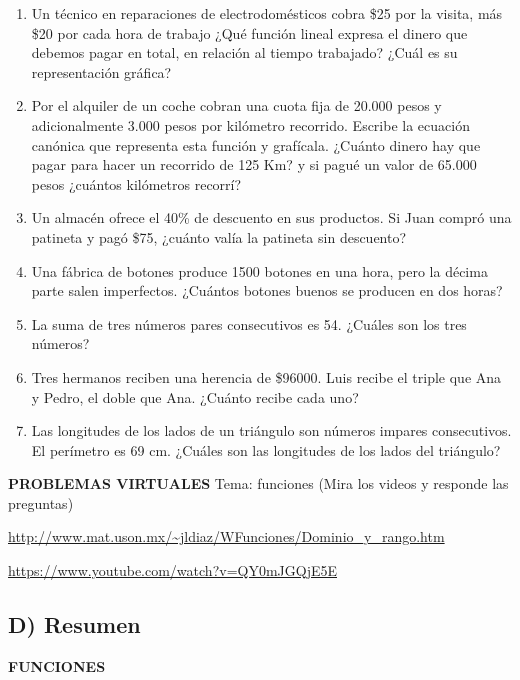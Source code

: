 \documentclass[12pt,a4paper]{article}
\begin{document}
\begin{enumerate}
\item Un técnico en reparaciones de electrodomésticos cobra \$25 por la visita, más \$20 por cada hora de trabajo ¿Qué función lineal expresa el dinero que debemos pagar en total, en relación al tiempo trabajado? ¿Cuál es su representación gráfica?

\item Por el alquiler de un coche cobran una cuota fija de 20.000 pesos y adicionalmente 3.000 pesos por kilómetro recorrido. Escribe la ecuación canónica que representa esta función y grafícala. ¿Cuánto dinero hay que pagar para hacer un recorrido de 125 Km? y si pagué un valor de 65.000 pesos ¿cuántos kilómetros recorrí?

\item Un almacén ofrece el 40\% de descuento en sus productos. Si Juan compró una patineta y pagó \$75, ¿cuánto valía la patineta sin descuento?

\item Una fábrica de botones produce 1500 botones en una hora, pero la décima parte salen imperfectos. ¿Cuántos botones buenos se producen en dos horas?

\item La suma de tres números pares consecutivos es 54. ¿Cuáles son los tres números?

\item Tres hermanos reciben una herencia de \$96000. Luis recibe el triple que Ana y Pedro, el doble que Ana. ¿Cuánto recibe cada uno?

\item Las longitudes de los lados de un triángulo son números impares consecutivos. El perímetro es 69 cm. ¿Cuáles son las longitudes de los lados del triángulo?
\end{enumerate}

\vspace{1cm}

\textbf{PROBLEMAS VIRTUALES} Tema: funciones (Mira los videos y responde las preguntas)

\url{http://www.mat.uson.mx/~jldiaz/WFunciones/Dominio_y_rango.htm}

\url{https://www.youtube.com/watch?v=QY0mJGQjE5E}

\newpage

\subsection*{D) Resumen}

\begin{center}
\textbf{FUNCIONES}
\end{center}
\end{document}
